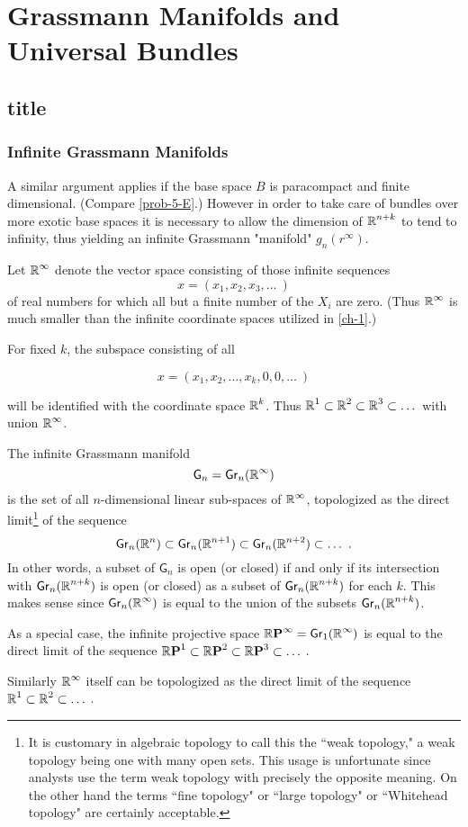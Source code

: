 \chapter{Grassmann Manifolds and Universal Bundles}

\section*{title}\label{sec5.8}



\subsection*{Infinite Grassmann Manifolds}

A similar argument applies if the base space $B$ is paracompact and finite dimensional. (Compare \cref{prob-5-E}.) However in order to take care of bundles over more exotic base spaces it is necessary to allow the dimension of $\boldsymbol{\mathbb{R}}^{n+k}$ to tend to infinity, thus yielding an infinite Grassmann "manifold" $g_{n}(r^{\infty})$.

Let $\boldsymbol{\mathbb{R}}^{\infty}$ denote the vector space consisting of those infinite sequences
\[
x=(x_{1}, x_{2}, x_{3}, \dots\ )
\]
of real numbers for which all but a finite number of the $X_{i}$ are zero. (Thus $\boldsymbol{\mathbb{R}}^{\infty}$ is much smaller than the infinite coordinate spaces utilized in \cref{ch-1}.)

For fixed $k$, the subspace consisting of all

\[
x=(x_{1}, x_{2}, \dots, x_{k}, 0,0, \dots\ )
\]

will be identified with the coordinate space $\boldsymbol{\mathbb{R}}^{k}$. Thus $\boldsymbol{\mathbb{R}}^{1} \subset \boldsymbol{\mathbb{R}}^{2} \subset \boldsymbol{\mathbb{R}}^{3} \subset \dots$ with union $\boldsymbol{\mathbb{R}}^{\infty}$.

\begin{definition}\label{def:5-2}
	The infinite Grassmann manifold
	\[
	\mathsf{G}_{n}=\grass{n}{\infty}
	\]
	is the set of all $n$-dimensional linear sub-spaces of $\boldsymbol{\mathbb{R}}^{\infty}$, topologized as the direct limit\footnote{It is customary in algebraic topology to call this the ``weak topology," a weak topology being one with many open sets. This usage is unfortunate since analysts use the term weak topology with precisely the opposite meaning. On the other hand the terms ``fine topology" or ``large topology" or ``Whitehead topology" are certainly acceptable.} of the sequence
	\[
	\grass{n}{n} \subset \grass{n}{n+1} \subset \grass{n}{n+2} \subset \dots\ .
	\]
	In other words, a subset of $\mathsf{G}_{n}$ is open (or closed) if and only if its intersection with $\grass{n}{n+k}$ is open (or closed) as a subset of $\grass{n}{n+k}$ for each $k$. This makes sense since $\grass{n}{\infty}$ is equal to the union of the subsets $\grass{n}{n+k}$.
	
	As a special case, the infinite projective space $\rp{\infty}=\grass{1}{\infty}$ is equal to the direct limit of the sequence $\boldsymbol{\mathbb{R}}\boldsymbol{\mathrm{P}}^{1} \subset \boldsymbol{\mathbb{R}}\boldsymbol{\mathrm{P}}^{2} \subset \boldsymbol{\mathbb{R}}\boldsymbol{\mathrm{P}}^{3} \subset \dots\ $.
	
	Similarly $\boldsymbol{\mathbb{R}}^{\infty}$ itself can be topologized as the direct limit of the sequence $\boldsymbol{\mathbb{R}}^{1} \subset \boldsymbol{\mathbb{R}}^{2} \subset \dots\ $.
\end{definition}


